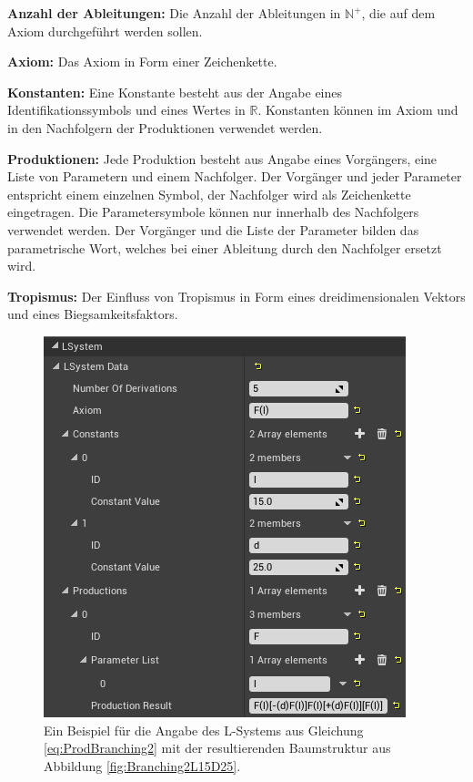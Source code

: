 \begin{description}
	\item \textbf{Anzahl der Ableitungen:} Die Anzahl der Ableitungen in $\mathbb{N}^+$, die auf dem Axiom durchgeführt werden sollen. \\
	
	\item \textbf{Axiom:} Das Axiom in Form einer Zeichenkette. \\
	
	\item \textbf{Konstanten:} Eine Konstante besteht aus der Angabe eines Identifikationssymbols und eines Wertes in $\mathbb{R}$. Konstanten können im Axiom und in den Nachfolgern der Produktionen verwendet werden.\\	
	
	\item \textbf{Produktionen:} Jede Produktion besteht aus Angabe eines Vorgängers, eine Liste von Parametern und einem Nachfolger. Der Vorgänger und jeder Parameter entspricht einem einzelnen Symbol, der Nachfolger wird als Zeichenkette eingetragen. Die Parametersymbole können nur innerhalb des Nachfolgers verwendet werden. Der Vorgänger und die Liste der Parameter bilden das parametrische Wort, welches bei einer Ableitung durch den Nachfolger ersetzt wird. \\
	
	\item \textbf{Tropismus:} Der Einfluss von Tropismus in Form eines dreidimensionalen Vektors und eines Biegsamkeitsfaktors.
\end{description}
\begin{figure} [hbtp]
	\centering
	\includegraphics[height=0.4\textheight]{images/LS_ExampleUE4UI.png}
	\caption{Ein Beispiel für die Angabe des L-Systems aus Gleichung \ref{eq:ProdBranching2} mit der resultierenden Baumstruktur aus Abbildung \ref{fig:Branching2L15D25}.}
	\label{fig:LS_ExampleUE4UI}
\end{figure}
